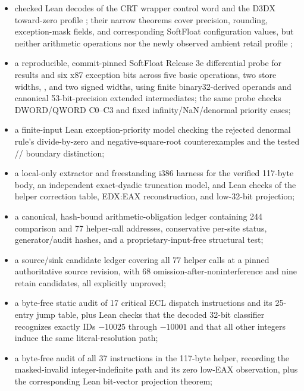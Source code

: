 \begin{itemize}
  summary, extracts all 244 mapped comparison/status/branch chains and bounded
  helper-result consumers, and has proprietary-input-free synthetic tests;
  \item checked Lean decodes of the CRT wrapper control word  and
  the D3DX toward-zero profile ; their narrow theorems cover
  precision, rounding, exception-mask fields, and corresponding SoftFloat
  configuration values, but neither arithmetic operations nor the newly
  observed ambient retail profile ;
  \item a reproducible, commit-pinned SoftFloat Release 3e differential probe
  for results and six x87 exception bits across five basic operations, two
  store widths, , and two signed  widths, using
  finite binary32-derived operands and canonical 53-bit-precision extended
  intermediates; the same probe checks DWORD/QWORD  C0--C3 and
  fixed infinity/NaN/denormal priority cases;
  \item a finite-input Lean exception-priority model checking the rejected
  denormal rule's divide-by-zero and negative-square-root counterexamples and
  the tested // boundary distinction;
  \item a local-only extractor and freestanding i386 harness for the verified
  117-byte  body, an independent exact-dyadic truncation model,
  and Lean checks of the helper correction table, EDX:EAX reconstruction, and
  low-32-bit projection;
  \item a canonical, hash-bound arithmetic-obligation ledger containing 244
  comparison and 77 helper-call addresses, conservative per-site status,
  generator/audit hashes, and a proprietary-input-free structural test;
  \item a source/sink candidate ledger covering all 77 helper calls at a pinned
  authoritative source revision, with 68 omission-after-noninterference and
  nine retain candidates, all explicitly unproved;
  \item a byte-free static audit of 17 critical ECL dispatch instructions and
  its 25-entry jump table, plus Lean checks that the decoded 32-bit classifier
  recognizes exactly IDs $-10025$ through $-10001$ and that all other integers
  induce the same literal-resolution path;
  \item a byte-free audit of all 37 instructions in the 117-byte helper,
  recording the masked-invalid integer-indefinite path and its zero low-EAX
  observation, plus the corresponding Lean bit-vector projection theorem;

\end{itemize}
